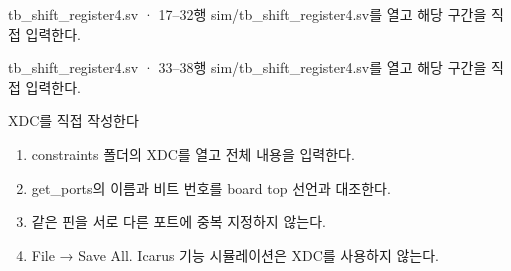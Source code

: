\begin{frame}{tb\_shift\_register4.sv · 17–32행}
\small
sim/tb\_shift\_register4.sv를 열고 해당 구간을 직접 입력한다.\par\vspace{0.4cm}\par\vspace{0.4cm}
\end{frame}

\begin{frame}{tb\_shift\_register4.sv · 33–38행}
\small
sim/tb\_shift\_register4.sv를 열고 해당 구간을 직접 입력한다.\par\vspace{0.4cm}\par\vspace{0.4cm}
\end{frame}

\begin{frame}{XDC를 직접 작성한다}
\small
\begin{enumerate}
\item constraints 폴더의 XDC를 열고 전체 내용을 입력한다.
\item get\_ports의 이름과 비트 번호를 board top 선언과 대조한다.
\item 같은 핀을 서로 다른 포트에 중복 지정하지 않는다.
\item File → Save All. Icarus 기능 시뮬레이션은 XDC를 사용하지 않는다.
\end{enumerate}
\end{frame}

